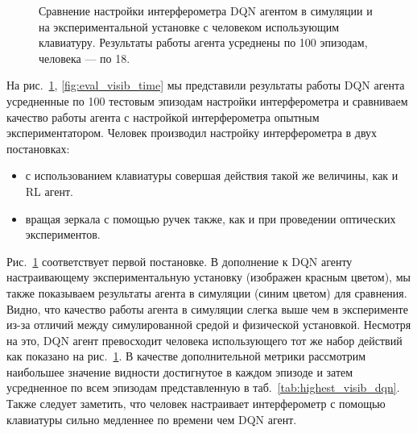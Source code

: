 \begin{figure}[ht]
\caption{Сравнение настройки интерферометра DQN агентом в симуляции и на экспериментальной установке с человеком использующим клавиатуру. Результаты работы агента усреднены по 100 эпизодам, человека --- по 18.}
\label{fig:eval_visib_step}
\end{figure}

На рис.~\ref{fig:eval_visib_step}, \ref{fig:eval_visib_time} мы представили результаты работы DQN агента усредненные по 100 тестовым эпизодам настройки интерферометра и сравниваем качество работы агента с настройкой интерферометра опытным экспериментатором. Человек производил настройку интерферометра в двух постановках:  

\begin{itemize}
    \item с использованием клавиатуры совершая действия такой же величины, как и RL агент. 
    \item вращая зеркала с помощью ручек также, как и при проведении оптических экспериментов.
\end{itemize}

Рис.~\ref{fig:eval_visib_step} соответствует первой постановке. В дополнение к DQN агенту настраивающему экспериментальную установку (изображен красным цветом), мы также показываем результаты агента в симуляции (синим цветом) для сравнения. Видно, что качество работы агента в симуляции слегка выше чем в эксперименте из-за отличий между симулированной средой и физической установкой. Несмотря на это, DQN агент превосходит человека использующего тот же набор действий как показано на рис.~\ref{fig:eval_visib_step}. В качестве дополнительной метрики рассмотрим наибольшее значение видности достигнутое в каждом эпизоде и затем усредненное по всем эпизодам представленную в таб.~\ref{tab:highest_visib_dqn}. Также следует заметить, что человек настраивает интерферометр с помощью клавиатуры сильно медленнее по времени чем DQN агент. 

